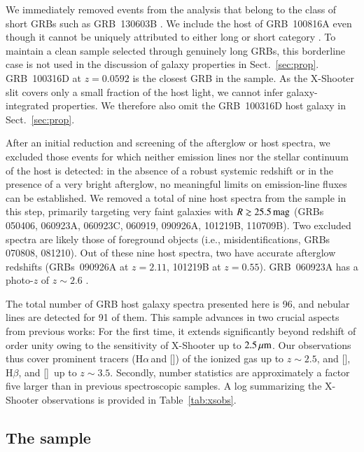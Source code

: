 \documentclass[traditabstract, longauth]{aa}
\newcommand{\hb}{H$\beta$}
\newcommand{\ha}{H$\alpha$}
\newcommand{\oii}{[\ion{O}{ii}]}
\newcommand{\oiii}{[\ion{O}{iii}]}
\newcommand{\nii}{[\ion{N}{ii}]}
\begin{document}
We immediately removed events from the analysis that belong to the class of short GRBs such as GRB~130603B \citep[e.g.,][]{2014A&A...563A..62D}. We include the host of GRB~100816A even though it cannot be uniquely attributed to either long or short category \citep{2010GCNR..300....1O}. To maintain a clean sample selected through genuinely long GRBs, this borderline case is not used in the discussion of galaxy properties in Sect.~\ref{sec:prop}. GRB~100316D at $z=0.0592$ \citep[e.g.,][]{2011MNRAS.411.2792S, 2012ApJ...753...67B} is the closest GRB in the sample. As the X-Shooter slit covers only a small fraction of the host light, we cannot infer galaxy-integrated properties. We therefore also omit the GRB~100316D host galaxy in Sect.~\ref{sec:prop}.

After an initial reduction and screening of the afterglow or host spectra, we excluded those events for which neither emission lines nor the stellar continuum of the host is detected: in the absence of a robust systemic redshift or in the presence of a very bright afterglow, no meaningful limits on emission-line fluxes can be established.  {We removed a total of nine host spectra from the sample in this step, primarily targeting very faint galaxies with $R\gtrsim25.5\,\rm{mag}$ (GRBs 050406, 060923A, 060923C, 060919, 090926A, 101219B, 110709B). Two excluded spectra are likely those of foreground objects (i.e., misidentifications, GRBs 070808, 081210). Out of these nine host spectra, two have accurate afterglow redshifts (GRBs~090926A at $z=2.11$, 101219B at $z=0.55$). GRB~060923A has a photo-$z$ of $z\sim2.6$ \citep{2008MNRAS.388.1743T, 2013ApJ...778..128P}.}

The total number of GRB host galaxy spectra presented here is 96, and nebular lines are detected for 91 of them. This sample advances in two crucial aspects from previous works: For the first time, it extends significantly beyond redshift of order unity owing to the sensitivity of X-Shooter up to $2.5\,\rm{\mu m}$. Our observations thus cover prominent tracers (\ha\,and \nii) of the ionized gas up to $z\sim2.5$, and \oii, \hb, and \oiii\, up to $z\sim3.5$. Secondly, number statistics are approximately a factor five larger than in previous spectroscopic samples. A log summarizing the X-Shooter observations is provided in Table~\ref{tab:xsobs}.

\subsection{The sample}
\end{document}
